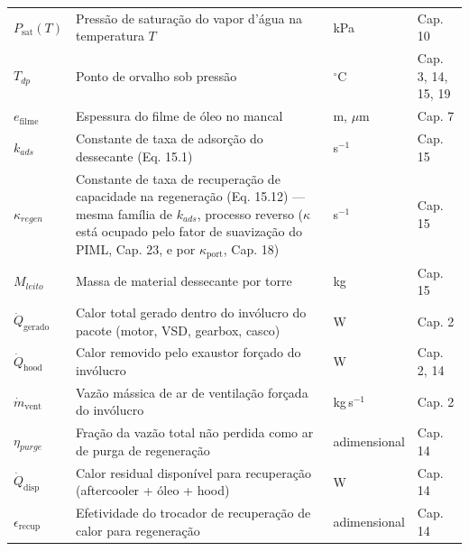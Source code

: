 \documentclass[12pt,a4paper]{article}
\numberwithin{equation}{section}
\numberwithin{table}{section}
\numberwithin{figure}{section}
\begin{document}
{{\begin{longtable}{>{\raggedright\arraybackslash}p{2.8cm} >{\raggedright\arraybackslash}p{5.3cm} >{\raggedright\arraybackslash}p{2.1cm} >{\raggedright\arraybackslash}p{4.2cm}}
	$P_{\text{sat}}(T)$ & Pressão de saturação do vapor d'água na temperatura $T$ & kPa & Cap. 10 \\
	$T_{dp}$ & Ponto de orvalho sob pressão & $^{\circ}$C & Cap. 3, 14, 15, 19 \\
	$e_{\text{filme}}$\dag & Espessura do filme de óleo no mancal & m, $\mu$m & Cap. 7 \\
	$k_{ads}$\dag & Constante de taxa de adsorção do dessecante (Eq. 15.1) & s$^{-1}$ & Cap. 15 \\
	$\kappa_{regen}$\dag & Constante de taxa de recuperação de capacidade na regeneração (Eq. 15.12) — mesma família de $k_{ads}$, processo reverso ($\kappa$ está ocupado pelo fator de suavização do PIML, Cap. 23, e por $\kappa_{\text{port}}$, Cap. 18) & s$^{-1}$ & Cap. 15 \\
	$M_{leito}$ & Massa de material dessecante por torre & kg & Cap. 15 \\
	$\dot{Q}_{\text{gerado}}$ & Calor total gerado dentro do invólucro do pacote (motor, VSD, gearbox, casco) & W & Cap. 2 \\
	$\dot{Q}_{\text{hood}}$ & Calor removido pelo exaustor forçado do invólucro & W & Cap. 2, 14 \\
	$\dot{m}_{\text{vent}}$ & Vazão mássica de ar de ventilação forçada do invólucro & kg\,s$^{-1}$ & Cap. 2 \\
	$\eta_{purge}$ & Fração da vazão total não perdida como ar de purga de regeneração & adimensional & Cap. 14 \\
	$\dot{Q}_{\text{disp}}$ & Calor residual disponível para recuperação (aftercooler + óleo + hood) & W & Cap. 14 \\
	$\epsilon_{\text{recup}}$ & Efetividade do trocador de recuperação de calor para regeneração & adimensional & Cap. 14 \\ \bottomrule
\end{longtable}

}}
\end{document}
